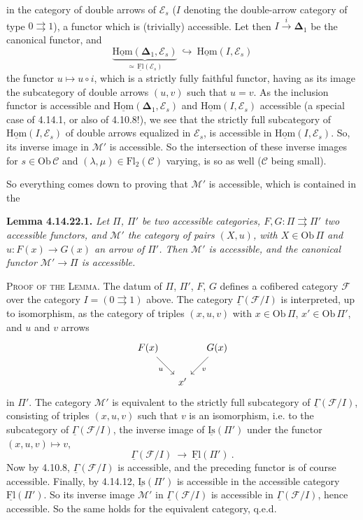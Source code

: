 \documentclass[11pt]{article}
\newcommand{\printedpage}[1]{\marginpar{\footnotesize p.~#1}}
\newcommand{\msp}[1]{\marginpar{\footnotesize [#1]}}
\newcommand{\uHom}{\underline{\mathrm{Hom}}}
\newcommand{\uFl}{\underline{\mathrm{Fl}}}
\newcommand{\uIs}{\underline{\mathrm{Is}}}
\newcommand{\uGamma}{\underline{\Gamma}}
\newcommand{\bDelta}{\boldsymbol{\Delta}}
\newcommand{\Ob}{\mathrm{Ob}\,}
\newcommand{\Fl}{\mathrm{Fl}}
\begin{document}
\printedpage{154}
in the category of double arrows of $\mathcal{E}_s$ ($I$ denoting the double-arrow category of type $0\rightrightarrows 1$), a functor which is (trivially) accessible. Let then $I\xrightarrow{\;i\;}\bDelta_1$ be the canonical functor, and
\[
\underbrace{\uHom(\bDelta_1,\mathcal{E}_s)}_{\simeq\,\uFl(\mathcal{E}_s)}\ \hookrightarrow\ \uHom(I,\mathcal{E}_s)
\]
the functor $u\longmapsto u\circ i$, which is a strictly fully faithful functor, having as its image the subcategory of double arrows $(u,v)$ such that $u=v$. As the inclusion functor is accessible and $\uHom(\bDelta_1,\mathcal{E}_s)$ and $\uHom(I,\mathcal{E}_s)$ accessible
\msp{page 406}
(a special case of 4.14.1, or also of 4.10.8!), we see that the strictly full subcategory of $\uHom(I,\mathcal{E}_s)$ of double arrows equalized in $\mathcal{E}_s$, is accessible in $\uHom(I,\mathcal{E}_s)$. So, its inverse image in $\mathcal{M}'$ is accessible. So the intersection of these inverse images for $s\in\Ob\mathcal{C}$ and $(\lambda,\mu)\in\Fl_2(\mathcal{C})$ varying, is so as well ($\mathcal{C}$ being small).

So everything comes down to proving that $\mathcal{M}'$ is accessible, which is contained in the

\textbf{Lemma 4.14.22.1.} \textit{Let $\Pi$, $\Pi'$ be two accessible categories, $F,G:\Pi\rightrightarrows\Pi'$ two accessible functors, and $\mathcal{M}'$ the category of pairs $(X,u)$, with $X\in\Ob\Pi$ and $u:F(x)\longrightarrow G(x)$ an arrow of $\Pi'$. Then $\mathcal{M}'$ is accessible, and the canonical functor $\mathcal{M}'\longrightarrow\Pi$ is accessible.} %

\textsc{Proof of the Lemma.} The datum of $\Pi$, $\Pi'$, $F$, $G$ defines a cofibered category $\mathcal{F}$ over the category $I=(0\rightrightarrows 1)$
\msp{page 407}
above. The category $\uGamma(\mathcal{F}/I)$ is interpreted, up to isomorphism, as the category of triples $(x,u,v)$ with $x\in\Ob\Pi$, $x'\in\Ob\Pi'$, and $u$ and $v$ arrows
\[
\begin{tikzcd}[column sep=small]
F(x) \arrow[dr, "u"'] & & G(x) \arrow[dl, "v"] \\
& x' &
\end{tikzcd}
\]
in $\Pi'$. The category $\mathcal{M}'$ is equivalent to the strictly full subcategory of $\uGamma(\mathcal{F}/I)$, consisting of triples $(x,u,v)$ such that $v$ is an isomorphism, i.e. to the subcategory of $\uGamma(\mathcal{F}/I)$, the inverse image of $\uIs(\Pi')$ under the functor $(x,u,v)\longmapsto v$,
\[
\uGamma(\mathcal{F}/I)\ \longrightarrow\ \uFl(\Pi')\ .
\]
Now by 4.10.8, $\uGamma(\mathcal{F}/I)$ is accessible, and the preceding functor is of course accessible. Finally, by 4.14.12,
\msp{page 408}
$\uIs(\Pi')$ is accessible in the accessible category $\uFl(\Pi')$. So its inverse image $\mathcal{M}'$ in $\uGamma(\mathcal{F}/I)$ is accessible in $\uGamma(\mathcal{F}/I)$, hence accessible. So the same holds for the equivalent category, q.e.d.
\end{document}

